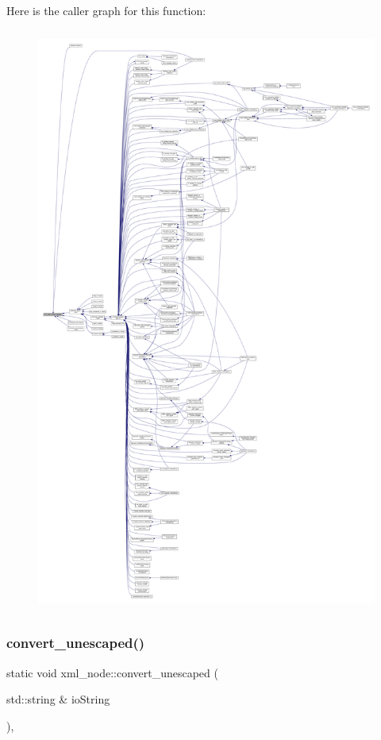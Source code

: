 Here is the caller graph for this function\+:
\nopagebreak
\begin{figure}[H]
\begin{center}
\leavevmode
\includegraphics[height=550pt]{d1/dc3/classxml__node_aa867d7c40fe47d98344e38b37fd34c1d_icgraph}
\end{center}
\end{figure}
\mbox{\label{classxml__node_a188abaf74feec1ee07866b84ce7d9550}} 
\subsubsection{\texorpdfstring{convert\+\_\+unescaped()}{convert\_unescaped()}}
{\footnotesize\ttfamily static void xml\+\_\+node\+::convert\+\_\+unescaped (\begin{DoxyParamCaption}\item[{std\+::string \&}]{io\+String }\end{DoxyParamCaption})\hspace{0.3cm}{\ttfamily [inline]}, {\ttfamily [static]}}



